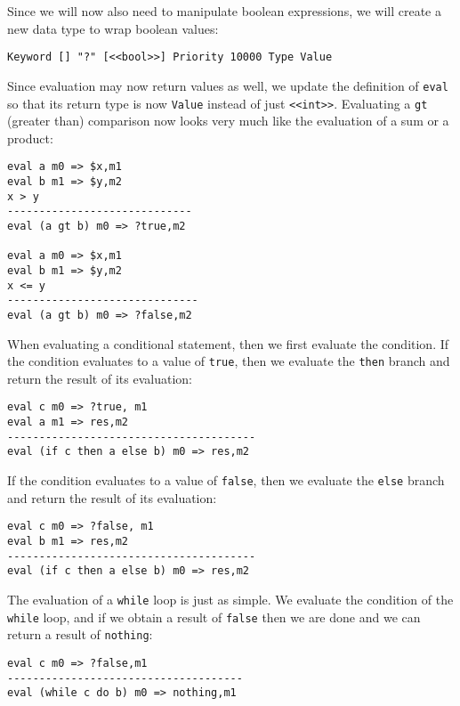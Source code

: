 Since we will now also need to manipulate boolean expressions, we will create a new data type to wrap boolean values:

\begin{lstlisting}
Keyword [] "?" [<<bool>>] Priority 10000 Type Value
\end{lstlisting}

Since evaluation may now return values as well, we update the definition of \texttt{eval} so that its return type is now \texttt{Value} instead of just \texttt{<<int>>}. Evaluating a \texttt{gt} (greater than) comparison now looks very much like the evaluation of a sum or a product:

\begin{lstlisting}
eval a m0 => $x,m1
eval b m1 => $y,m2
x > y
-----------------------------
eval (a gt b) m0 => ?true,m2

eval a m0 => $x,m1
eval b m1 => $y,m2
x <= y
------------------------------
eval (a gt b) m0 => ?false,m2
\end{lstlisting}

When evaluating a conditional statement, then we first evaluate the condition. If the condition evaluates to a value of \texttt{true}, then we evaluate the \texttt{then} branch and return the result of its evaluation:

\begin{lstlisting}
eval c m0 => ?true, m1
eval a m1 => res,m2
---------------------------------------
eval (if c then a else b) m0 => res,m2
\end{lstlisting}

If the condition evaluates to a value of \texttt{false}, then we evaluate the \texttt{else} branch and return the result of its evaluation:

\begin{lstlisting}
eval c m0 => ?false, m1
eval b m1 => res,m2
---------------------------------------
eval (if c then a else b) m0 => res,m2
\end{lstlisting}

The evaluation of a \texttt{while} loop is just as simple. We evaluate the condition of the \texttt{while} loop, and if we obtain a result of \texttt{false} then we are done and we can return a result of \texttt{nothing}:

\begin{lstlisting}
eval c m0 => ?false,m1
-------------------------------------
eval (while c do b) m0 => nothing,m1
\end{lstlisting}

